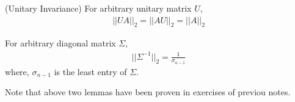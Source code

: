 \documentclass[11pt,a4paper]{article}
\begin{document}
\begin{lemma}
    (Unitary Invariance) For arbitrary unitary matrix $U$, 
    \begin{align}
        || U A ||_2 = || A U ||_2 = || A ||_2 
    \end{align}
\end{lemma}

\begin{lemma}
    For arbitrary diagonal matrix $\Sigma$, 
    \begin{align}
        || \Sigma^{-1} ||_2 = \frac{1}{\sigma_{n-1}}
    \end{align}
    where, $\sigma_{n-1}$ is the least entry of $\Sigma$. 
\end{lemma}
Note that above two lemmas have been proven in exercises of previou notes.

\newpage
\end{document}
